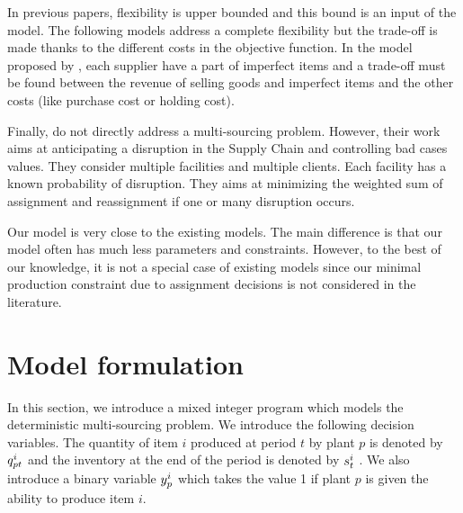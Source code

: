 In previous papers, flexibility is upper bounded and this bound is an input of the model.
The following models address a complete flexibility but the trade-off is made thanks to the different costs in the objective function.
In the model proposed by \citet{Rezaei2008}, each supplier have a part of imperfect items and a trade-off must be found between the revenue of selling goods and imperfect items and the other costs (like purchase cost or holding cost).


Finally, \citet{Snyder2006b} do not directly address a multi-sourcing problem.
However, their work aims at anticipating a disruption in the Supply Chain and controlling bad cases values.
They consider multiple facilities and multiple clients.
Each facility has a known probability of disruption.
They aims at minimizing the weighted sum of assignment and reassignment if one or many disruption occurs.


Our model is very close to the existing models.
The main difference is that our model often has much less parameters and constraints.
However, to the best of our knowledge, it is not a special case of existing models since our minimal production constraint due to assignment decisions is not considered in the literature.


\section{Model formulation}
\label{sec:multi-sourcing:deterministic:model-formulation}


In this section, we introduce a mixed integer program which models the deterministic multi-sourcing problem.
We introduce the following decision variables.
The quantity of item $i$ produced at period $t$ by plant $p$ is denoted by $q_{pt}^i$ and the inventory at the end of the period is denoted by $s_t^i$ .
We also introduce a binary variable $y_p^i$ which takes the value 1 if plant $p$ is given the ability to produce item $i$.


